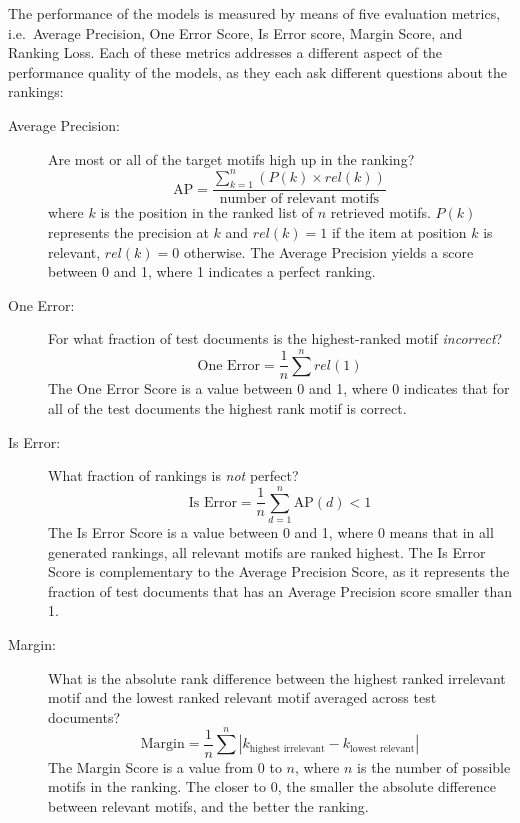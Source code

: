 The performance of the models is measured by means of five evaluation metrics, i.e.\ Average Precision, One Error Score, Is Error score, Margin Score, and Ranking Loss. Each of these metrics addresses a different aspect of the performance quality of the models, as they each ask different questions about the rankings:\autocite{tsoumakas:2010}
\begin{description}
\item[Average Precision:] Are most or all of the target motifs high up in the ranking?
\begin{equation}
\text{AP} = \frac{\sum^n_{k=1} (P(k) \times rel(k))}{\text{number of relevant motifs}}
\end{equation}
where $k$ is the position in the ranked list of $n$ retrieved motifs. $P(k)$ represents the precision at $k$ and $rel(k) = 1$ if the item at position $k$ is relevant, $rel(k) = 0$ otherwise. The Average Precision yields a score between 0 and 1, where 1 indicates a perfect ranking.
\item[One Error:] For what fraction of test documents is the highest-ranked motif \emph{incorrect}?
\begin{equation}
\text{One Error} = \frac{1}{n} \sum^n rel(1)
\end{equation}
The One Error Score is a value between 0 and 1, where 0 indicates that for all of the test documents the highest rank motif is correct.
\item[Is Error:] What fraction of rankings is \emph{not} perfect?
\begin{equation}
\text{Is Error} = \frac{1}{n} \sum^n_{d=1} \text{AP}(d) < 1
\end{equation}
The Is Error Score is a value between 0 and 1, where 0 means that in all generated rankings, all relevant motifs are ranked highest. The Is Error Score is complementary to the Average Precision Score, as it represents the fraction of test documents that has an Average Precision score smaller than 1.
\item[Margin:] What is the absolute rank difference between the highest ranked irrelevant motif and the lowest ranked relevant motif averaged across test documents?
\begin{equation}
\text{Margin} = \frac{1}{n} \sum^n |k_{\text{highest irrelevant}} - k_{\text{lowest relevant}}|
\end{equation}
The Margin Score is a value from 0 to $n$, where $n$ is the number of possible motifs in the ranking. The closer to 0, the smaller the absolute difference between relevant motifs, and the better the ranking.

\end{description}
